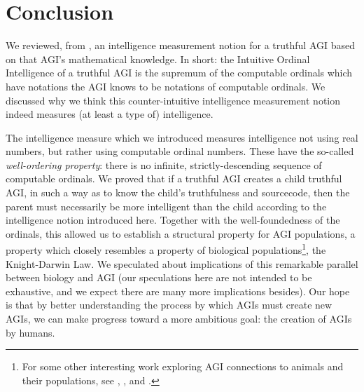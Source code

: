 \documentclass[runningheads]{llncs}
\begin{document}
\section{Conclusion}
\label{conclusionsection}

We reviewed, from \cite{alexander2019measuring}, an intelligence measurement notion
for a truthful AGI based on that AGI's mathematical knowledge.
In short: the Intuitive Ordinal Intelligence of a truthful AGI is the supremum of the
computable ordinals which have notations the AGI knows to be notations of
computable ordinals. We discussed why we think this counter-intuitive intelligence
measurement notion indeed measures (at least a type of) intelligence.

The intelligence measure which we introduced measures intelligence not using real
numbers, but rather using computable ordinal numbers. These have the so-called
\emph{well-ordering property}: there is no infinite, strictly-descending sequence
of computable ordinals. We proved that if a truthful AGI creates
a child truthful AGI, in such a way as to know the child's truthfulness and sourcecode,
then the parent must necessarily be more intelligent than the child according
to the intelligence notion introduced here. Together with the well-foundedness
of the ordinals, this allowed us to establish a structural property for AGI populations,
a property which closely resembles a property of biological populations\footnote{For
some other interesting work exploring AGI connections to animals and their
populations,
see \cite{beyret2019animal}, \cite{strannegaard2018learning},
and \cite{yoshida2017homeostatic}.}, the Knight-Darwin
Law. We speculated about implications of this remarkable parallel between biology and
AGI (our speculations here are not intended to be exhaustive, and we expect there
are many more implications besides). Our hope is that by better understanding
the process by which AGIs must create new AGIs, we can make progress toward a more
ambitious goal: the creation of AGIs by humans.




\end{document}
